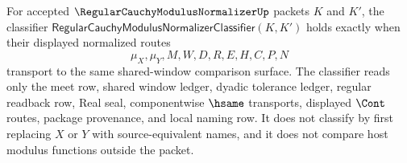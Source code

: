 \begin{definition}
\label{def:regular-cauchy-modulus-normalizer-classifier}
For accepted $\RegularCauchyModulusNormalizerUp$ packets $K$ and $K'$, the classifier $\mathsf{RegularCauchyModulusNormalizerClassifier}(K,K')$ holds exactly when their displayed normalized routes
$$
\mu_X,\mu_Y,M,W,D,R,E,H,C,P,N
$$
transport to the same shared-window comparison surface. The classifier reads only the meet row, shared window ledger, dyadic tolerance ledger, regular readback row, Real seal, componentwise $\hsame$ transports, displayed $\Cont$ routes, package provenance, and local naming row. It does not classify by first replacing $X$ or $Y$ with source-equivalent names, and it does not compare host modulus functions outside the packet.
\end{definition}

